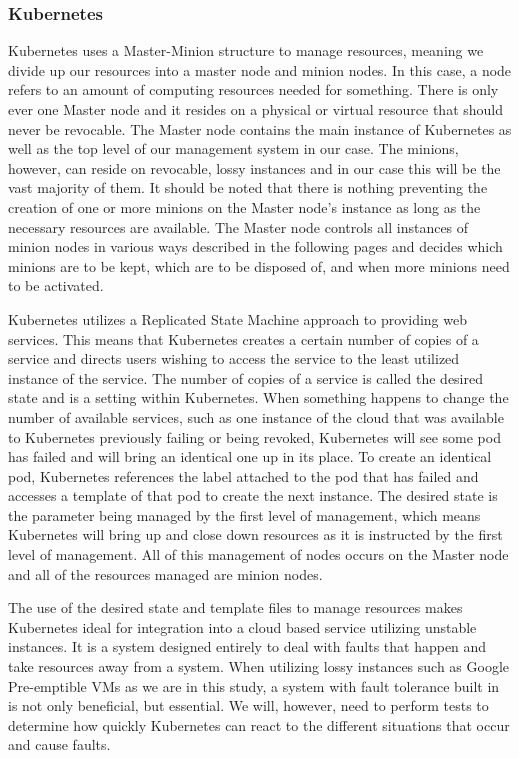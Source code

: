 \documentclass[thesis,proposal]{umassthesis}  %
\begin{document}
\subsubsection{Kubernetes}
	Kubernetes uses a Master-Minion structure to manage resources, meaning we divide up our resources into a master node and minion nodes. In this case, a node refers to an amount of computing resources needed for something. There is only ever one Master node and it resides on a physical or virtual resource that should never be revocable. The Master node contains the main instance of Kubernetes as well as the top level of our management system in our case. The minions, however, can reside on revocable, lossy instances and in our case this will be the vast majority of them. It should be noted that there is nothing preventing the creation of one or more minions on the Master node’s instance as long as the necessary resources are available. The Master node controls all instances of minion nodes in various ways described in the following pages and decides which minions are to be kept, which are to be disposed of, and when more minions need to be activated.\par
Kubernetes utilizes a Replicated State Machine approach to providing web services. This means that Kubernetes creates a certain number of copies of a service and directs users wishing to access the service to the least utilized instance of the service. The number of copies of a service is called the desired state and is a setting within Kubernetes. When something happens to change the number of available services, such as one instance of the cloud that was available to Kubernetes previously failing or being revoked, Kubernetes will see some pod has failed and will bring an identical one up in its place. To create an identical pod, Kubernetes references the label attached to the pod that has failed and accesses a template of that pod to create the next instance. The desired state is the parameter being managed by the first level of management, which means Kubernetes will bring up and close down resources as it is instructed by the first level of management. All of this management of nodes occurs on the Master node and all of the resources managed are minion nodes.\par
	The use of the desired state and template files to manage resources makes Kubernetes ideal for integration into a cloud based service utilizing unstable instances. It is a system designed entirely to deal with faults that happen and take resources away from a system. When utilizing lossy instances such as Google Pre-emptible VMs as we are in this study, a system with fault tolerance built in is not only beneficial, but essential. We will, however, need to perform tests to determine how quickly Kubernetes can react to the different situations that occur and cause faults.\par
\end{document}
